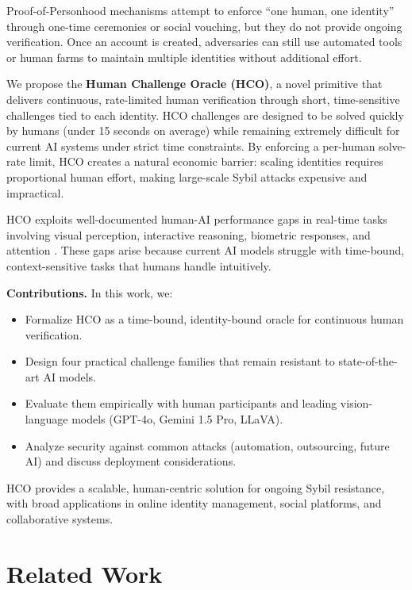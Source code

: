 \documentclass[sigconf,nonacm]{acmart}
\begin{document}
	Proof-of-Personhood mechanisms \cite{bowe2020proof,west2020proof} attempt to enforce ``one human, one identity'' through one-time ceremonies or social vouching, but they do not provide ongoing verification. Once an account is created, adversaries can still use automated tools or human farms to maintain multiple identities without additional effort.
	
	We propose the \textbf{Human Challenge Oracle (HCO)}, a novel primitive that delivers continuous, rate-limited human verification through short, time-sensitive challenges tied to each identity. HCO challenges are designed to be solved quickly by humans (under 15 seconds on average) while remaining extremely difficult for current AI systems under strict time constraints. By enforcing a per-human solve-rate limit, HCO creates a natural economic barrier: scaling identities requires proportional human effort, making large-scale Sybil attacks expensive and impractical.
	
	HCO exploits well-documented human-AI performance gaps in real-time tasks involving visual perception, interactive reasoning, biometric responses, and attention \cite{geirhos2018generalisation,brendel2019approximating}. These gaps arise because current AI models struggle with time-bound, context-sensitive tasks that humans handle intuitively.
	
	\textbf{Contributions.} In this work, we:
	\begin{itemize}
		\item Formalize HCO as a time-bound, identity-bound oracle for continuous human verification.
		\item Design four practical challenge families that remain resistant to state-of-the-art AI models.
		\item Evaluate them empirically with human participants and leading vision-language models (GPT-4o, Gemini 1.5 Pro, LLaVA).
		\item Analyze security against common attacks (automation, outsourcing, future AI) and discuss deployment considerations.
	\end{itemize}
	
	HCO provides a scalable, human-centric solution for ongoing Sybil resistance, with broad applications in online identity management, social platforms, and collaborative systems.

\section{Related Work}
\end{document}
